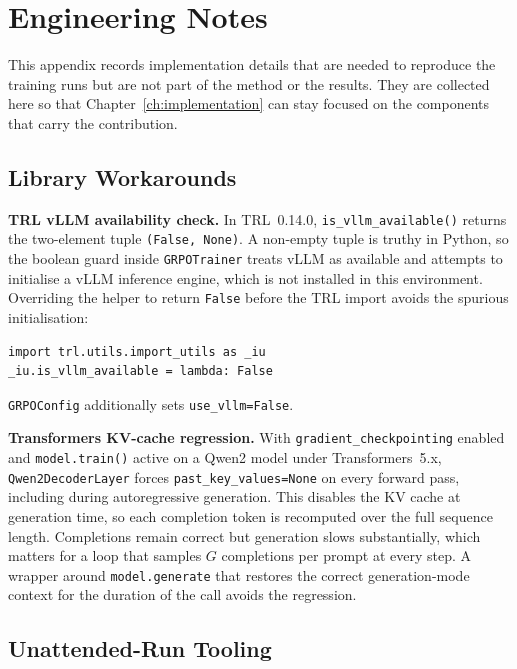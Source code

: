 \chapter{Engineering Notes}
\label{app:eng-notes}

This appendix records implementation details that are needed to reproduce the
training runs but are not part of the method or the results. They are collected
here so that Chapter~\ref{ch:implementation} can stay focused on the components
that carry the contribution.

\section{Library Workarounds}
\label{app:lib-workarounds}

\textbf{TRL vLLM availability check.}
In TRL~0.14.0, \texttt{is\_vllm\_available()} returns the two-element tuple
\texttt{(False, None)}.
A non-empty tuple is truthy in Python, so the boolean guard inside
\texttt{GRPOTrainer} treats vLLM as available and attempts to initialise a vLLM
inference engine, which is not installed in this environment.
Overriding the helper to return \texttt{False} before the TRL import avoids the
spurious initialisation:
\begin{lstlisting}[caption={TRL vLLM check override}]
import trl.utils.import_utils as _iu
_iu.is_vllm_available = lambda: False
\end{lstlisting}
\texttt{GRPOConfig} additionally sets \texttt{use\_vllm=False}.

\textbf{Transformers KV-cache regression.}
With \texttt{gradient\_checkpointing} enabled and \texttt{model.train()} active on
a Qwen2 model under Transformers~5.x, \texttt{Qwen2DecoderLayer} forces
\texttt{past\_key\_values=None} on every forward pass, including during
autoregressive generation.
This disables the KV cache at generation time, so each completion token is
recomputed over the full sequence length.
Completions remain correct but generation slows substantially, which matters for a
loop that samples $G$ completions per prompt at every step.
A wrapper around \texttt{model.generate} that restores the correct generation-mode
context for the duration of the call avoids the regression.

\section{Unattended-Run Tooling}
\label{app:run-tooling}

